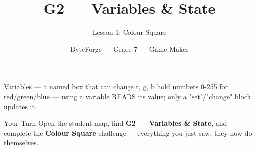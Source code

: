 \documentclass[aspectratio=169]{beamer}
\title{G2 — Variables \& State}
\subtitle{Lesson 1: Colour Square}
\author{ByteForge --- Grade 7 --- Game Maker}
\date{}
\begin{document}
\begin{frame}
    \titlepage
\end{frame}

\begin{frame}{Variables — a named box that can change}
    \Large
    r, g, b hold numbers 0-255 for red/green/blue — using a variable READS its value; only a "set"/"change" block updates it.
\end{frame}

\begin{frame}{Your Turn}
    \Large
    Open the student map, find \textbf{G2 — Variables \& State}, and complete
    the \textbf{Colour Square} challenge --- everything you just saw, they now do themselves.
\end{frame}
\end{document}
